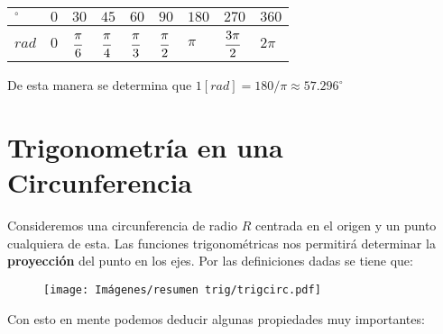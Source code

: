 \documentclass[letterpaper,11pt]{article}
\begin{document}
\begin{table}[h!]
    \centering
    \begin{tabular}{|m{2em}||m{2em}|m{2em}|m{2em}|m{2em}|m{2em}|m{2em}|m{2em}|m{2em}|}
    \hline
    $^{\circ}$ & $0$ & $30$ & $45$ & $60$ & $90$ & $180$ & $270$ & $360$ \\[1ex]\hline
    $rad$ & $0$ & $\cfrac{\pi}{6}$ & $\cfrac{\pi}{4}$ & $\cfrac{\pi}{3}$ & $\cfrac{\pi}{2}$ & $\pi$ & $\cfrac{3\pi}{2}$ & $2\pi$ \\ [3ex] 
    \hline
    \end{tabular}
\end{table}

De esta manera se determina que $1 [rad]=180/\pi\approx 57.296^{\circ}$

\section{Trigonometría en una Circunferencia}
Consideremos una circunferencia de radio $R$ centrada en el origen y un punto cualquiera de esta. Las funciones trigonométricas nos permitirá determinar la \textbf{proyección} del punto en los ejes. Por las definiciones dadas se tiene que:

\begin{figure}[h!]
    \centering
    \texttt{[image: Imágenes/resumen trig/trigcirc.pdf]}
\end{figure}

Con esto en mente podemos deducir algunas propiedades muy importantes:
\end{document}
